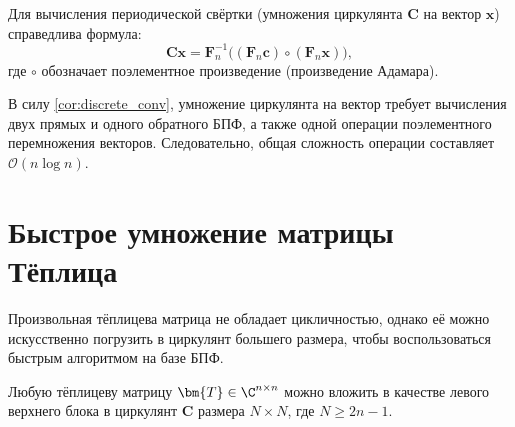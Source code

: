 \begin{tcbcorollary}
\label{cor:discrete_conv}
    Для вычисления периодической свёртки (умножения циркулянта $\bm{C}$ на вектор $\bm{x}$) справедлива формула:
    \begin{equation}
        \bm{C}\bm{x} = \bm{F}_n^{-1} \bigl( (\bm{F}_n \bm{c}) \circ (\bm{F}_n \bm{x}) \bigr),
    \end{equation}
    где $\circ$ обозначает поэлементное произведение (произведение Адамара).
\end{tcbcorollary}

В силу \cref{cor:discrete_conv}, умножение циркулянта на вектор требует вычисления двух прямых и одного обратного БПФ, а также одной операции поэлементного перемножения векторов. Следовательно, общая сложность операции составляет $\mathcal{O}(n \log n)$.

\section{Быстрое умножение матрицы Тёплица}
\label{sec:toeplitz_fast}

Произвольная тёплицева матрица не обладает цикличностью, однако её можно искусственно погрузить в циркулянт большего размера, чтобы воспользоваться быстрым алгоритмом на базе БПФ.

\begin{tcblemma}
\label{lem:embedding}
    Любую тёплицеву матрицу $\bm{T} \in \C^{n \times n}$ можно вложить в качестве левого верхнего блока в циркулянт $\bm{C}$ размера $N \times N$, где $N \geq 2n-1$.
\end{tcblemma}

